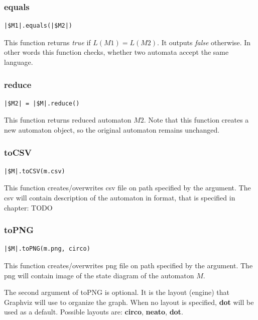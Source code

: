 \documentclass{ctuthesis}
\begin{document}
\subsubsection{equals}
\begin{lstlisting}[language = JASL_snippet]
	|$M1|.equals(|$M2|)
\end{lstlisting}

This function returns \textit{true} if $L(M1) = L(M2)$. It outputs \textit{false} otherwise. In other words this function checks, whether two automata accept the same language. 

\subsubsection{reduce}
\begin{lstlisting}[language = JASL_snippet]
	|$M2| = |$M|.reduce()
\end{lstlisting}

This function returns reduced automaton $M2$. Note that this function creates a new automaton object, so the original automaton remains unchanged.

\subsubsection{toCSV}
\begin{lstlisting}[language = JASL_snippet]
	|$M|.toCSV(m.csv)
\end{lstlisting}

This function creates/overwrites csv file on path specified by the argument. The csv will contain description of the automaton in format, that is specified in chapter: TODO

\subsubsection{toPNG}
\begin{lstlisting}[language = JASL_snippet]
	|$M|.toPNG(m.png, circo)
\end{lstlisting}

This function creates/overwrites png file on path specified by the argument. The png will contain image of the state diagram of the automaton $M$. 

The second argument of toPNG is optional. It is the layout (engine) that Graphviz will use to organize the graph. When no layout is specified, \textbf{dot} will be used as a default. Possible layouts are: \textbf{circo}, \textbf{neato}, \textbf{dot}.
\end{document}
